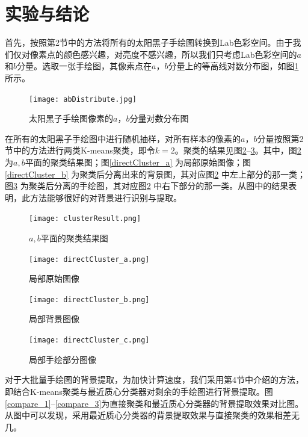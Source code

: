 \documentclass[UTF8,a4paper,twoside]{ctexart}
\begin{document}
\section{实验与结论}

首先，按照第2节中的方法将所有的太阳黑子手绘图转换到Lab色彩空间。由于我们仅对像素点的颜色感兴趣，对亮度不感兴趣，所以我们只考虑Lab色彩空间的$a$和$b$分量。选取一张手绘图，其像素点在$a$，$b$分量上的等高线对数分布图，如图\ref{abDistribute} 所示。

\begin{figure}[H]
  \centering
  \texttt{[image: abDistribute.jpg]}
  \caption{太阳黑子手绘图像素的$a$，$b$分量对数分布图}\label{abDistribute}
\end{figure}

在所有的太阳黑子手绘图中进行随机抽样，对所有样本的像素的$a$，$b$分量按照第2节中的方法进行两类K-means聚类，即令$k = 2$。聚类的结果见图\ref{clusterResult}--\ref{directCluster_c}。其中，图\ref{clusterResult} 为$a,b$平面的聚类结果图；图\ref{directCluster_a} 为局部原始图像；图\ref{directCluster_b} 为聚类后分离出来的背景图，其对应图\ref{clusterResult} 中左上部分的那一类；图\ref{directCluster_c} 为聚类后分离的手绘图，其对应图\ref{clusterResult} 中右下部分的那一类。从图中的结果表明，此方法能够很好的对背景进行识别与提取。

\begin{figure}[H]
  \centering
  \texttt{[image: clusterResult.png]}
  \caption{$a, b$平面的聚类结果图}
  \label{clusterResult}
\end{figure}

\begin{figure}[H]
  \centering
  \begin{minipage}{5cm}
    \centering
    \texttt{[image: directCluster\_a.png]}
    \caption{局部原始图像}
    \label{directCluster_a}
  \end{minipage}
  \hspace{0.2cm}%
  \begin{minipage}{5cm}
    \centering
    \texttt{[image: directCluster\_b.png]}
    \caption{局部背景图像}
    \label{directCluster_b}
  \end{minipage}
  \hspace{0.2cm}%
  \begin{minipage}{5cm}
    \centering
    \texttt{[image: directCluster\_c.png]}
    \caption{局部手绘部分图像}
    \label{directCluster_c}
  \end{minipage}
\end{figure}

对于大批量手绘图的背景提取，为加快计算速度，我们采用第4节中介绍的方法，即结合K-means聚类与最近质心分类器对剩余的手绘图进行背景提取。图\ref{compare_1}--\ref{compare_3}为直接聚类和最近质心分类器的背景提取效果对比图。从图中可以发现，采用最近质心分类器的背景提取效果与直接聚类的效果相差无几。
\end{document}
